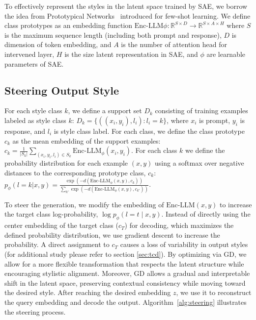 To effectively represent the styles in the latent space trained by SAE, we borrow the idea from Prototypical Networks~\cite{snell2017prototypical} introduced for few-shot learning.
We define class prototypes as an embedding function 
\( \text{Enc-LLM}{\phi}: \mathbb{R}^{S\times D} \to \mathbb{R}^{S\times A \times H} \) where $S$ is the maximum sequence length (including both prompt and response), $D$ is dimension of token embedding, and $A$ is the number of attention head for intervened layer, $H$ is the size latent representation in SAE, and $\phi$  are learnable parameters of SAE.

\subsection{Steering Output Style} For each style class \(k\), we define a support set $D_k$ consisting of training examples labeled as style class \(k\): \( D_k = \{((x_i, y_i), l_i) : l_i = k\} \), where $x_i$ is prompt, $y_i$ is response, and $l_i$ is style class label. For each class, we define the class prototype $c_k$ as the mean embedding of the support examples:
$c_k = \frac{1}{|S_k|} \sum_{(x_i, y_i, l_i) \in S_k} \text{Enc-LLM}_{\phi}(x_i,y_i)$. 
For each class $k$ we define the probability distribution for each example $(x,y)$ using a softmax over negative distances to the corresponding prototype class, $c_k$: $p_{\phi}(l = k | x, y) = \frac{\exp(-d(\text{Enc-LLM}_{\phi}(x,y), c_k))}{\sum_{k'} \exp(-d(\text{Enc-LLM}_{\phi}(x,y), c_{k'}))}$.

To steer the generation, we modify the embedding of $\text{Enc-LLM}(x,y)$ to increase the target class log-probability, $\log p_\phi( l = t \mid x,y)$.
Instead of directly using the center embedding of the target class ($c_T$) for decoding, which maximizes the defined probability distribution, we use gradient descent to increase the probability. A direct assignment to $c_T$ causes a loss of variability in output styles (for additional study please refer to section {\ref{sec:tcd}}). By optimizing via GD, we allow for a more flexible transformation that respects the latent structure while encouraging stylistic alignment. Moreover, GD allows a gradual and interpretable shift in the latent space, preserving contextual consistency while moving toward the desired style. 
After reaching the desired embedding $z$, we use it to reconstruct the query embedding and decode the output. Algorithm~\ref{alg:steering} illustrates the steering process. 


